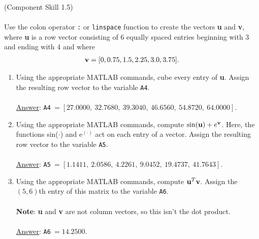 \documentclass[12pt]{article}
\newenvironment{exercise}[2][\large Exercise]{\begin{trivlist}
\item[\centering \Large \hskip \labelsep {\bfseries #1}\hskip \labelsep {\bfseries #2.}]}{\end{trivlist}}
\begin{document}
\vspace{1cm}
\begin{exercise}{\large 4} {\large (Component Skill 1.5)} ~\\\\
Use the colon operator \verb|:| or \verb|linspace| function to create the vectors {\bf u} and {\bf v}, where {\bf u} is a row vector consisting of 6 equally spaced entries beginning with $3$ and ending with $4$ and where 
\begin{align*}
    \textrm{\bf v} = [0,0.75,1.5,2.25,3.0,3.75].
\end{align*}
\begin{enumerate}
    \item Using the appropriate MATLAB commands, cube every entry of {\bf u}. Assign the resulting row vector to the variable \verb|A4|.
    \\\\
\underline{Answer}: \verb|A4|$~= [27.0000,~32.7680,~39.3040, ~46.6560, ~54.8720, ~ 64.0000]$. \\
    \item Using the appropriate MATLAB commands, compute $\sin(\textrm{\bf u}) + e^{\textrm{\bf v}}$. Here, the functions sin($\cdot$) and e$^{(\cdot)}$ act on each entry of a vector. Assign the resulting row vector to the variable \verb|A5|.   \\\\
\underline{Answer}: \verb|A5|$~= [1.1411,~2.0586,~4.2261, ~9.0452, ~19.4737, ~ 41.7643]$. \\
    \item Using the appropriate MATLAB commands, compute $\textrm{\bf u}^T\textrm{\bf v}$. Assign the $(5,6)$th entry of this matrix to the variable \verb|A6|. \\\\
    \textbf{Note}: {\bf u} and {\bf v} are not column vectors, so this isn't the dot product. \\\\
\underline{Answer}: \verb|A6|$~= 14.2500$. \\
\end{enumerate}
\vspace{1cm}

\end{exercise}
\end{document}
